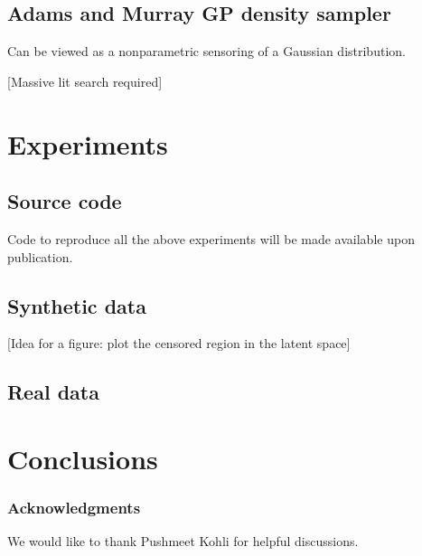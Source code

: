 \documentclass{article}
\begin{document}
\subsection{ Adams and Murray GP density sampler }

Can be viewed as a nonparametric sensoring of a Gaussian distribution.

[Massive lit search required]


\section{Experiments}

\subsection{Source code}

Code to reproduce all the above experiments will be made available upon publication.


\subsection{Synthetic data}



[Idea for a figure: plot the censored region in the latent space]

\subsection{Real data}



\section{Conclusions}

\subsubsection*{Acknowledgments}

We would like to thank Pushmeet Kohli for helpful discussions.



\end{document}
